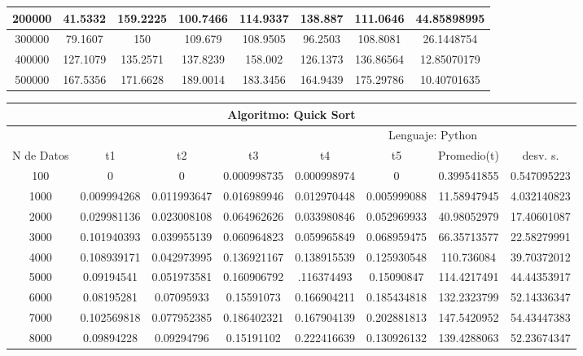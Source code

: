 \documentclass{article}
\begin{document}
\begin{table}[]
\begin{tabular}{|c|c|c|c|c|c|c|c| }
                200000	&41.5332	     &159.2225	&100.7466	&114.9337	&138.887	     &111.0646	&44.85898995\\ \hline
                300000	&79.1607	     &150	    &109.679	    &108.9505	&96.2503	     &108.8081	&26.1448754\\ \hline
                400000	&127.1079	&135.2571	&137.8239	&158.002	      &126.1373	&136.86564	&12.85070179\\ \hline
                500000	&167.5356	&171.6628	&189.0014	&183.3456	&164.9439	&175.29786	&10.40701635\\ \hline
        \end{tabular}
    \end{table} 
    
    
            \begin{table}[]
        \begin{tabular}{|c|c|c|c|c|c|c|c| }
            \hline
            \multicolumn{8}{|c|}{Algoritmo: Quick Sort} \\ \hline
            \multicolumn{4}{|c|}{} & \multicolumn{4}{c|}{Lenguaje: Python} \\ \hline
              N de Datos &     t1    &  t2         &  t3          &   t4        &    t5     &   Promedio(t)       & desv. s. \\ \hline 
100	&0	&0	&0.000998735&	0.000998974&	0	&0.399541855	&0.547095223\\ \hline
1000	&0.009994268	&0.011993647	&0.016989946	&0.012970448&	0.005999088	&11.58947945	&4.032140823\\ \hline
2000	&0.029981136	&0.023008108	&0.064962626	&0.033980846	&0.052969933	&40.98052979	&17.40601087\\ \hline
3000	&0.101940393	&0.039955139	&0.060964823	&0.059965849	&0.068959475	&66.35713577	&22.58279991\\ \hline
4000	&0.108939171	&0.042973995	&0.136921167	&0.138915539	&0.125930548	&110.736084	&39.70372012\\ \hline
5000	&0.09194541	&0.051973581	&0.160906792	&.116374493	&0.15090847	&114.4217491	&44.44353917\\ \hline
6000	&0.08195281	&0.07095933	&0.15591073	&0.166904211	&0.185434818	&132.2323799	&52.14336347\\ \hline
7000	&0.102569818	&0.077952385	&0.186402321	&0.167904139	&0.202881813	&147.5420952	&54.43447383\\ \hline
8000	&0.09894228	&0.09294796	&0.15191102	&0.222416639	&0.130926132	&139.4288063	&52.23674347\\ \hline

\end{tabular}
\end{table}
\end{document}
